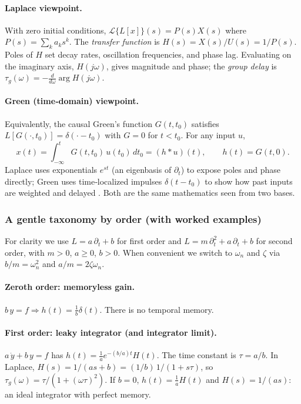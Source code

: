 \paragraph{Laplace viewpoint.}
With zero initial conditions, \(\mathcal{L}\{L[x]\}(s)=P(s)X(s)\) where \(P(s)=\sum_k a_k s^k\). The \emph{transfer function} is \(H(s)=X(s)/U(s)=1/P(s)\). Poles of \(H\) set decay rates, oscillation frequencies, and phase lag. Evaluating on the imaginary axis, \(H(j\omega)\), gives magnitude and phase; the \emph{group delay} is \(\tau_g(\omega)=-\frac{d}{d\omega}\arg H(j\omega)\).

\paragraph{Green (time‑domain) viewpoint.}
Equivalently, the causal Green's function \(G(t,t_0)\) satisfies \(L[G(\cdot,t_0)]=\delta(\cdot-t_0)\) with \(G=0\) for \(t<t_0\). For any input \(u\),
\[
x(t)=\int_{-\infty}^t G(t,t_0)\,u(t_0)\,dt_0=(h*u)(t),\qquad h(t)=G(t,0).
\]
Laplace uses exponentials \(e^{st}\) (an eigenbasis of \(\partial_t\)) to expose poles and phase directly; Green uses time‑localized impulses \(\delta(t-t_0)\) to show how past inputs are weighted and delayed  \cite{StakgoldHolst2011}. Both are the same mathematics seen from two bases.

\subsubsection*{A gentle taxonomy by order (with worked examples)}
For clarity we use \(L=a\,\partial_t+b\) for first order and \(L=m\,\partial_t^2+a\,\partial_t+b\) for second order, with \(m>0\), \(a\ge0\), \(b>0\). When convenient we switch to \(\omega_n\) and \(\zeta\) via \(b/m=\omega_n^2\) and \(a/m=2\zeta\omega_n\).

\paragraph{Zeroth order: memoryless gain.}
\(b\,y=f\Rightarrow h(t)=\frac{1}{b}\delta(t)\). There is no temporal memory.

\paragraph{First order: leaky integrator (and integrator limit).}
\(a\,\dot y+b\,y=f\) has \(h(t)=\frac{1}{a}e^{-(b/a)t}H(t)\). The time constant is \(\tau=a/b\). In Laplace, \(H(s)=1/(a s+b)=(1/b)\,1/(1+s\tau)\), so \(\tau_g(\omega)=\tau/(1+(\omega\tau)^2)\). If \(b=0\), \(h(t)=\frac{1}{a}H(t)\) and \(H(s)=1/(a s)\): an ideal integrator with perfect memory.

